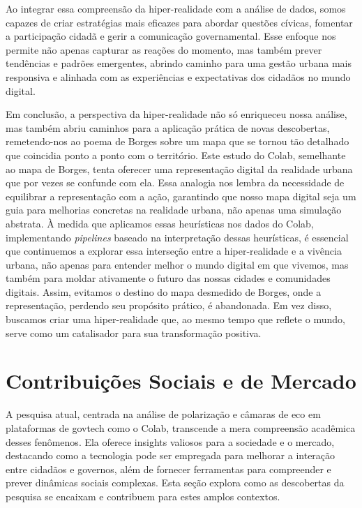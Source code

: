 Ao integrar essa compreensão da hiper-realidade com a análise de dados, somos capazes de criar estratégias mais eficazes para abordar questões cívicas, fomentar a participação cidadã e gerir a comunicação governamental. Esse enfoque nos permite não apenas capturar as reações do momento, mas também prever tendências e padrões emergentes, abrindo caminho para uma gestão urbana mais responsiva e alinhada com as experiências e expectativas dos cidadãos no mundo digital.

Em conclusão, a perspectiva da hiper-realidade não só enriqueceu nossa análise, mas também abriu caminhos para a aplicação prática de novas descobertas, remetendo-nos ao poema de Borges sobre um mapa que se tornou tão detalhado que coincidia ponto a ponto com o território. Este estudo do Colab, semelhante ao mapa de Borges, tenta oferecer uma representação digital da realidade urbana que por vezes se confunde com ela. Essa analogia nos lembra da necessidade de equilibrar a representação com a ação, garantindo que nosso mapa digital seja um guia para melhorias concretas na realidade urbana, não apenas uma simulação abstrata. À medida que aplicamos essas heurísticas nos dados do Colab, implementando \textit{pipelines} baseado na interpretação dessas heurísticas, é essencial que continuemos a explorar essa interseção entre a hiper-realidade e a vivência urbana, não apenas para entender melhor o mundo digital em que vivemos, mas também para moldar ativamente o futuro das nossas cidades e comunidades digitais. Assim, evitamos o destino do mapa desmedido de Borges, onde a representação, perdendo seu propósito prático, é abandonada. Em vez disso, buscamos criar uma hiper-realidade que, ao mesmo tempo que reflete o mundo, serve como um catalisador para sua transformação positiva.

\section{Contribuições Sociais e de Mercado}

A pesquisa atual, centrada na análise de polarização e câmaras de eco em plataformas de govtech como o Colab, transcende a mera compreensão acadêmica desses fenômenos. Ela oferece insights valiosos para a sociedade e o mercado, destacando como a tecnologia pode ser empregada para melhorar a interação entre cidadãos e governos, além de fornecer ferramentas para compreender e prever dinâmicas sociais complexas. Esta seção explora como as descobertas da pesquisa se encaixam e contribuem para estes amplos contextos.

